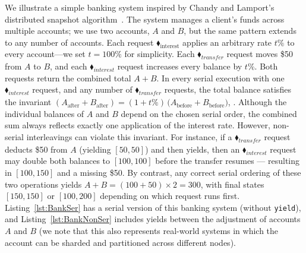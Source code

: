 We illustrate a simple banking system inspired by Chandy and Lamport’s distributed snapshot algorithm~\cite{ChLa85}.  The system manages a client’s funds across multiple accounts; we use two accounts, \(A\) and \(B\), but the same pattern extends to any number of accounts.  Each request {\color{ForestGreen}$\blacklozenge_\text{interest}$} applies an arbitrary rate \(t\%\) to every account—we set \(t=100\%\) for simplicity.
%
Each {\color{ForestGreen}$\blacklozenge_{\mathit{transfer}}$} request moves \$50 from \(A\) to \(B\), and each {\color{ForestGreen}$\blacklozenge_{\mathit{interest}}$} request increases every balance by \(t\%\).  Both requests return the combined total \(A + B\).
%
In every serial execution with one {\color{ForestGreen}$\blacklozenge_{\mathit{interest}}$} request, and any number of {\color{ForestGreen}$\blacklozenge_{\mathit{transfer}}$} requests, the total balance satisfies the invariant
$
(A_{\text{after}} + B_{\text{after}})
= (1 + t\%) \,\bigl(A_{\text{before}} + B_{\text{before}}\bigr)
$,
%
%
.  Although the individual balances of \(A\) and \(B\) depend on the chosen serial order, the combined sum always reflects exactly one application of the interest rate.
%
However, non-serial interleavings can violate this invariant.  For instance, if a {\color{ForestGreen}$\blacklozenge_{\mathit{transfer}}$} request deducts \$50 from \(A\) (yielding \([50,50]\)) and then yields, then an {\color{ForestGreen}$\blacklozenge_{\mathit{interest}}$} request may double both balances to \([100,100]\) before the transfer resumes --- resulting in \([100,150]\) and a missing \$50.  By contrast, any correct serial ordering of these two operations yields \(A + B = (100+50)\times2 = 300\), with final states \([150,150]\) or \([100,200]\) depending on which request runs first.
%
%
Listing~\ref{lst:BankSer} has a serial version of this banking system (without \texttt{yield}), and Listing~\ref{lst:BankNonSer} includes yields between the adjustment of accounts $A$ and $B$ (we note that this also represents real-world systems in which the account can be sharded and partitioned across different nodes).
%


